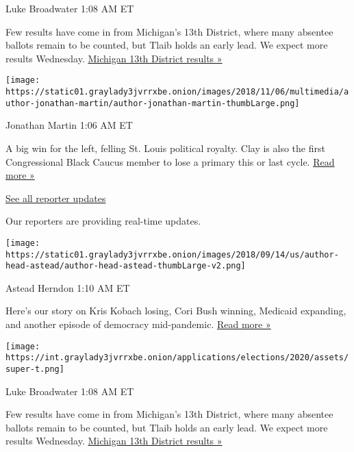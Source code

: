 Luke Broadwater 1:08 AM ET

Few results have come in from Michigan's 13th District, where many
absentee ballots remain to be counted, but Tlaib holds an early lead. We
expect more results Wednesday.
\href{https://www.nytimes3xbfgragh.onion/interactive/2020/08/04/us/elections/results-michigan-house-district-13-primary-election.html?action=click\&module=ELEX_results\&pgtype=Interactive\&region=ReporterUpdates}{Michigan
13th District results »}

\texttt{[image: https://static01.graylady3jvrrxbe.onion/images/2018/11/06/multimedia/author-jonathan-martin/author-jonathan-martin-thumbLarge.png]}

Jonathan Martin 1:06 AM ET

A big win for the left, felling St. Louis political royalty. Clay is
also the first Congressional Black Caucus member to lose a primary this
or last cycle.
\href{https://www.nytimes3xbfgragh.onion/2020/08/05/us/politics/cori-bush-missouri-william-lacy-clay.html?action=click\&module=ELEX_results\&pgtype=Interactive\&region=ReporterUpdates}{Read
more »}

\href{https://www.nytimes3xbfgragh.onion/interactive/2020/08/04/us/elections/live-analysis-arizona-kansas-michigan-missouri-primaries.html?action=click\&module=ELEX_results\&pgtype=Interactive\&region=Component}{See
all reporter updates}

Our reporters are providing real-time updates.

\texttt{[image: https://static01.graylady3jvrrxbe.onion/images/2018/09/14/us/author-head-astead/author-head-astead-thumbLarge-v2.png]}

Astead Herndon 1:10 AM ET

Here's our story on Kris Kobach losing, Cori Bush winning, Medicaid
expanding, and another episode of democracy mid-pandemic.
\href{https://www.nytimes3xbfgragh.onion/2020/08/04/us/politics/kobach-tlaib.html?action=click\&module=ELEX_results\&pgtype=Interactive\&region=ReporterUpdates}{Read
more »}

\texttt{[image: https://int.graylady3jvrrxbe.onion/applications/elections/2020/assets/super-t.png]}

Luke Broadwater 1:08 AM ET

Few results have come in from Michigan's 13th District, where many
absentee ballots remain to be counted, but Tlaib holds an early lead. We
expect more results Wednesday.
\href{https://www.nytimes3xbfgragh.onion/interactive/2020/08/04/us/elections/results-michigan-house-district-13-primary-election.html?action=click\&module=ELEX_results\&pgtype=Interactive\&region=ReporterUpdates}{Michigan
13th District results »}

